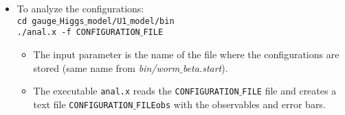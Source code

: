 \documentclass[a4paper,10pt]{report}
\begin{document}
\begin{itemize}[leftmargin=*]
 \item To analyze the configurations:
 \vspace*{2mm}
 \texttt{
 \\cd gauge$\_$Higgs$\_$model/U1$\_$model/bin
 \\./anal.x -f CONFIGURATION$\_$FILE
 }

 \begin{itemize}[leftmargin=*]
  \item The input parameter is the name of the file where the configurations are stored (same
  name from {\it bin/worm$\_$beta.start}).
  \item The executable {\tt anal.x} reads the {\tt CONFIGURATION$\_$FILE} file 
  and creates a text file {\tt CONFIGURATION$\_$FILEobs} with the observables and error bars.
 \end{itemize}
\end{itemize}
\end{document}
